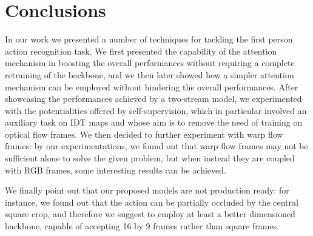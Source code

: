 \documentclass[10pt,twocolumn,letterpaper]{article}
\begin{document}
\section{Conclusions}

In our work we presented a number of techniques for tackling the first person action recognition task. We first presented the capability of the attention mechanism in boosting the overall performances without requiring a complete retraining of the backbone, and we then later showed how a simpler attention mechanism can be employed without hindering the overall performances. After showcasing the performances achieved by a two-stream model, we experimented with the potentialities offered by self-supervision, which in particular involved an auxiliary task on IDT maps and whose aim is to remove the need of training on optical flow frames. We then decided to further experiment with warp flow frames: by our experimentations, we found out that warp flow frames may not be sufficient alone to solve the given problem, but when instead they are coupled with RGB frames, some interesting results can be achieved.

We finally point out that our proposed models are not production ready: for instance, we found out that the action can be partially occluded by the central square crop, and therefore we suggest to employ at least a better dimensioned backbone, capable of accepting 16 by 9 frames rather than square frames.

{\small


}
\end{document}
